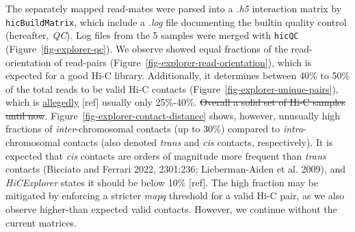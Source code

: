 \documentclass[
  11pt,
  a4paper,
]{scrbook}
\let\oldemph\emph
\renewcommand\emph[1]{\oldemph{\color{gray}#1}}
\begin{document}
The separately mapped read-mates were parsed into a \emph{.h5}
interaction matrix by \texttt{hicBuildMatrix}, which include a
\emph{.log} file documenting the builtin quality control (hereafter,
\emph{QC}). Log files from the 5 samples were merged with \texttt{hicQC}
(Figure~\ref{fig-explorer-qc}). We observe showed equal fractions of the
read-orientation of read-pairs
(Figure~\ref{fig-explorer-read-orientation}), which is expected for a
good Hi-C library. Additionally, it determines between 40\% to 50\% of
the total reads to be valid Hi-C contacts
(Figure~\ref{fig-explorer-unique-pairs}), which is
\href{https://hicexplorer.readthedocs.io/en/latest/content/example_usage.html\#creation-of-a-hi-c-matrix}{allegedly}
{[}ref{]} usually only 25\%-40\%. \st{Overall a solid set of Hi-C
samples until now}. Figure~\ref{fig-explorer-contact-distance} shows,
however, unusually high fractions of \emph{inter}-chromosomal contacts
(up to 30\%) compared to \emph{intra}-chromosomal contacts (also denoted
\emph{trans} and \emph{cis} contacts, respectively). It is expected that
\emph{cis} contacts are orders of magnitude more frequent than
\emph{trans} contacts (Bicciato and Ferrari 2022, 2301:236;
Lieberman-Aiden et al. 2009), and \emph{HiCExplorer} states it should be
below 10\% {[}ref{]}. The high fraction may be mitigated by enforcing a
stricter \emph{mapq} threshold for a valid Hi-C pair, as we also observe
higher-than expected valid contacts. However, we continue without the
current matrices.
\end{document}

